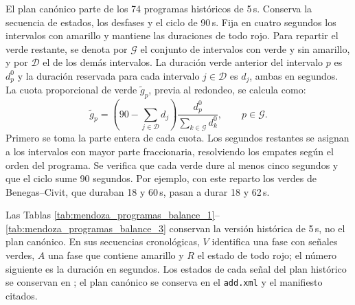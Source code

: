 El plan canónico parte de los 74 programas históricos de 5\,s. Conserva la secuencia de estados, los desfases y el ciclo de 90\,s. Fija en cuatro segundos los intervalos con amarillo y mantiene las duraciones de todo rojo. Para repartir el verde restante, se denota por $\mathcal{G}$ el conjunto de intervalos con verde y sin amarillo, y por $\mathcal{D}$ el de los demás intervalos. La duración verde anterior del intervalo $p$ es $d_p^0$ y la duración reservada para cada intervalo $j\in\mathcal{D}$ es $d_j$, ambas en segundos. La cuota proporcional de verde $\widetilde g_p$, previa al redondeo, se calcula como:
\begin{equation}
 \widetilde g_p=\left(90-\sum_{j\in\mathcal{D}}d_j\right)
 \frac{d_p^0}{\sum_{k\in\mathcal{G}}d_k^0},\qquad p\in\mathcal{G}.
 \label{eq:mendoza_conversion_fija}
\end{equation}
Primero se toma la parte entera de cada cuota. Los segundos restantes se asignan a los intervalos con mayor parte fraccionaria, resolviendo los empates según el orden del programa. Se verifica que cada verde dure al menos cinco segundos y que el ciclo sume 90 segundos. Por ejemplo, con este reparto los verdes de Benegas--Civit, que duraban 18 y 60\,s, pasan a durar 18 y 62\,s.

Las Tablas \ref{tab:mendoza_programas_balance_1}--\ref{tab:mendoza_programas_balance_3} conservan la versión histórica de 5\,s, no el plan canónico. En sus secuencias cronológicas, $V$ identifica una fase con señales verdes, $A$ una fase que contiene amarillo y $R$ el estado de todo rojo; el número siguiente es la duración en segundos. Los estados de cada señal del plan histórico se conservan en ; el plan canónico se conserva en el \texttt{add.xml} y el manifiesto citados.

\begin{table}[H]\centering\footnotesize
\caption{Programas semafóricos históricos de 5 s, controladores 1--25.}\label{tab:mendoza_programas_balance_1}

\end{table}
\begin{table}[H]\centering\footnotesize
\caption{Programas semafóricos históricos de 5 s, controladores 26--50.}\label{tab:mendoza_programas_balance_2}

\end{table}
\begin{table}[H]\centering\footnotesize
\caption{Programas semafóricos históricos de 5 s, controladores 51--74.}\label{tab:mendoza_programas_balance_3}

\end{table}

